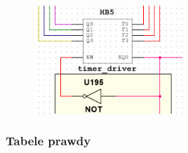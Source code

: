 \documentclass[a4paper]{article}
\begin{document}
\begin{figure}[H]
    \centering
    \includegraphics[width=0.5\textwidth]{timer_driver_black_box.png}
\end{figure}
\subsubsection{Tabele prawdy}
\end{document}
